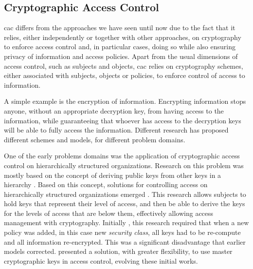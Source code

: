 \subsection{Cryptographic Access Control}

\gls{cac} differs from the approaches we have seen until now due to the fact that it relies, either independently or together with other approaches, on cryptography to enforce access control and, in particular cases, doing so while also ensuring privacy of information and access policies. Apart from the usual dimensions of access control, such as subjects and objects, \gls{cac} relies on cryptography schemes, either associated with subjects, objects or policies, to enforce control of access to information.

A simple example is the encryption of information. Encrypting information stops anyone, without an appropriate decryption key, from having access to the information, while guaranteeing that whoever has access to the decryption keys will be able to fully access the information. Different research has proposed different schemes and models, for different problem domains.  

One of the early problems domains was the application of cryptographic access control on hierarchically structured organizations. Research on this problem was mostly based on the concept of deriving public keys from other keys in a hierarchy \cite{denning_master_1981}. Based on this concept, solutions for controlling access on hierarchically structured organizations emerged \cite{akl_cryptographic_1983, sandhu_cryptographic_1988}. This research allows subjects to hold keys that represent their level of access, and then be able to derive the keys for the levels of access that are below them, effectively allowing access management with cryptography. Initially \cite{akl_cryptographic_1983}, this research required that when a new policy was added, in this case new \emph{security class}, all keys had to be re-compute and all information re-encrypted. This was a significant disadvantage that earlier models \cite{sandhu_cryptographic_1988} corrected. \citeauthor{brassard_flexible_1990} \cite{brassard_flexible_1990} presented a solution, with greater flexibility, to use master cryptographic keys in access control, evolving these initial works.

